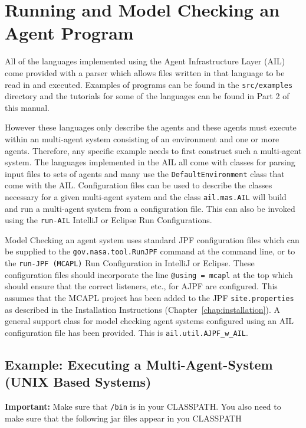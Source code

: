 \chapter{Running and Model Checking an Agent Program}
\label{chap:running}

All of the languages implemented using the Agent Infrastructure Layer (AIL) come provided with a parser which allows files written in that language to be read in and executed.  Examples of programs can be found in the \texttt{src/examples} directory and the tutorials for some of the languages can be found in Part 2 of this manual.

However these languages only describe the agents and these agents must execute within an multi-agent system consisting of an environment and one or more agents.  Therefore, any specific example needs to first construct such a multi-agent system.  The languages implemented in the AIL all come with classes for parsing input files to sets of agents and many use the \texttt{DefaultEnvironment} class that come with the AIL. Configuration files can be used to describe the classes necessary  for a given multi-agent system and the class \texttt{ail.mas.AIL} will build and run a multi-agent system from a configuration file.  This can also be invoked using the \texttt{run-AIL} IntelliJ or Eclipse Run Configurations.

Model Checking an agent system uses standard JPF configuration files which can be supplied to the \texttt{gov.nasa.tool.RunJPF} command at the command line, or to the \texttt{run-JPF (MCAPL)} Run Configuration in IntelliJ or Eclipse.  These configuration files should incorporate the line \texttt{@using = mcapl} at the top which should ensure that the correct listeners, etc., for AJPF are configured.  This assumes that the MCAPL project has been added to the JPF \texttt{site.properties} as described in the Installation Instructions (Chapter~\ref{chap:installation}).  A general support class for model checking agent systems configured using an AIL configuration file has been provided.  This is \texttt{ail.util.AJPF\_w\_AIL}. 

\section{Example: Executing a Multi-Agent-System (UNIX Based Systems)}
{\bf Important:} Make sure that \texttt{\ajpfversion/bin} is in your CLASSPATH.  You also need to make sure that the following jar files appear in you CLASSPATH

